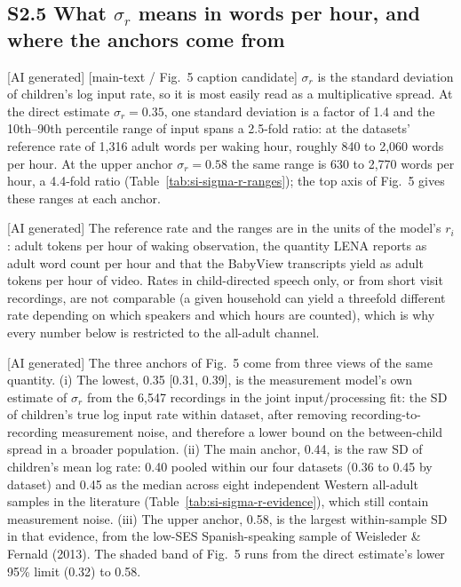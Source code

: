 \subsection*{S2.5 What $\sigma_r$ means in words per hour, and where the anchors come from}

[AI generated] [main-text / Fig.~5 caption candidate] $\sigma_r$ is the standard
deviation of children's log input rate, so it is most easily read as a
multiplicative spread. At the direct estimate $\sigma_r = 0.35$, one standard
deviation is a factor of 1.4 and the 10th--90th percentile range of input spans a
2.5-fold ratio: at the datasets' reference rate of 1,316 adult words per waking
hour, roughly 840 to 2,060 words per hour. At the upper anchor $\sigma_r = 0.58$
the same range is 630 to 2,770 words per hour, a 4.4-fold ratio
(Table~\ref{tab:si-sigma-r-ranges}); the top axis of Fig.~5 gives these ranges
at each anchor.

\begin{table}[htbp]
\centering\footnotesize
\caption{[AI generated] What each value of $\sigma_r$ (the population SD of log
input rate) implies for the spread of input across children, and the input share
of efficiency variance it yields on the analytic curve of Fig.~5. Percentile
ranges are computed at the reference rate, the geometric mean of the four
datasets' geometric-mean rates (1,316 adult words per waking hour); the
percentile ratio does not depend on the reference. Regenerated by
\texttt{paper/tables/sigma\_r\_tables.R}.}
\label{tab:si-sigma-r-ranges}

\end{table}

[AI generated] The reference rate and the ranges are in the units of the model's
$r_i$: adult tokens per hour of waking observation, the quantity LENA reports as
adult word count per hour and that the BabyView transcripts yield as adult tokens
per hour of video. Rates in child-directed speech only, or from short visit
recordings, are not comparable (a given household can yield a threefold different
rate depending on which speakers and which hours are counted), which is why every
number below is restricted to the all-adult channel.

[AI generated] The three anchors of Fig.~5 come from three views of the same
quantity. (i) The lowest, 0.35 [0.31, 0.39], is the measurement model's own
estimate of $\sigma_r$ from the 6,547 recordings in the joint input/processing
fit: the SD of children's true log input rate within dataset, after removing
recording-to-recording measurement noise, and therefore a lower bound on the
between-child spread in a broader population. (ii) The main anchor, 0.44, is the
raw SD of children's mean log rate: 0.40 pooled within our four datasets (0.36 to
0.45 by dataset) and 0.45 as the median across eight independent Western
all-adult samples in the literature (Table~\ref{tab:si-sigma-r-evidence}), which
still contain measurement noise. (iii) The upper anchor, 0.58, is the largest
within-sample SD in that evidence, from the low-SES Spanish-speaking sample of
Weisleder \& Fernald (2013). The shaded band of Fig.~5 runs from the direct
estimate's lower 95\% limit (0.32) to 0.58.

